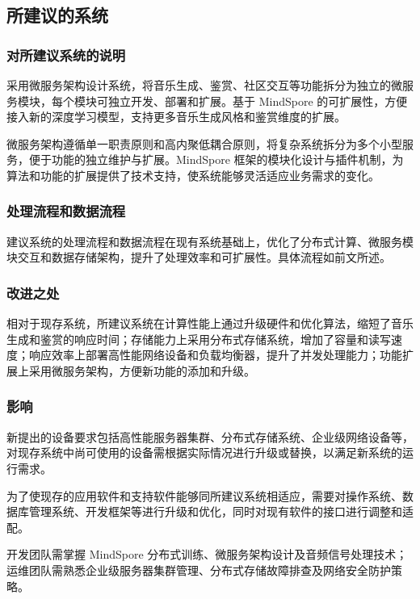 \documentclass{base}
\numberwithin{figure}{section} %
\begin{document}
\subsection{所建议的系统}

\subsubsection{对所建议系统的说明}

采用微服务架构设计系统，将音乐生成、鉴赏、社区交互等功能拆分为独立的微服务模块，每个模块可独立开发、部署和扩展。基于 MindSpore 的可扩展性，方便接入新的深度学习模型，支持更多音乐生成风格和鉴赏维度的扩展。​

微服务架构遵循单一职责原则和高内聚低耦合原则，将复杂系统拆分为多个小型服务，便于功能的独立维护与扩展。MindSpore 框架的模块化设计与插件机制，为算法和功能的扩展提供了技术支持，使系统能够灵活适应业务需求的变化。

\subsubsection{处理流程和数据流程}

建议系统的处理流程和数据流程在现有系统基础上，优化了分布式计算、微服务模块交互和数据存储架构，提升了处理效率和可扩展性。具体流程如前文所述。

\subsubsection{改进之处}

相对于现存系统，所建议系统在计算性能上通过升级硬件和优化算法，缩短了音乐生成和鉴赏的响应时间；存储能力上采用分布式存储系统，增加了容量和读写速度；响应效率上部署高性能网络设备和负载均衡器，提升了并发处理能力；功能扩展上采用微服务架构，方便新功能的添加和升级。

\subsubsection{影响}

新提出的设备要求包括高性能服务器集群、分布式存储系统、企业级网络设备等，对现存系统中尚可使用的设备需根据实际情况进行升级或替换，以满足新系统的运行需求。

为了使现存的应用软件和支持软件能够同所建议系统相适应，需要对操作系统、数据库管理系统、开发框架等进行升级和优化，同时对现有软件的接口进行调整和适配。

开发团队需掌握 MindSpore 分布式训练、微服务架构设计及音频信号处理技术；运维团队需熟悉企业级服务器集群管理、分布式存储故障排查及网络安全防护策略。
\end{document}

